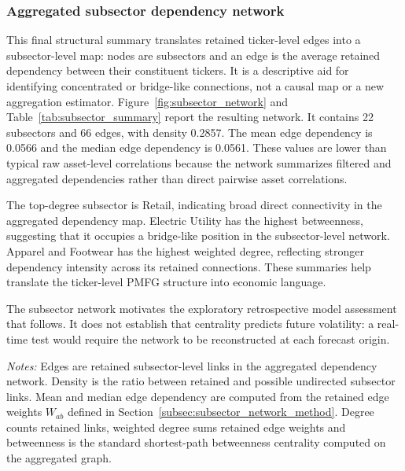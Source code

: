 \subsubsection{Aggregated subsector dependency network}
\label{sec:subsector_network}

This final structural summary translates retained ticker-level edges into a subsector-level map: nodes are subsectors and an edge is the average retained dependency between their constituent tickers. It is a descriptive aid for identifying concentrated or bridge-like connections, not a causal map or a new aggregation estimator. Figure~\ref{fig:subsector_network} and Table~\ref{tab:subsector_summary} report the resulting network. It contains 22 subsectors and 66 edges, with density 0.2857. The mean edge dependency is 0.0566 and the median edge dependency is 0.0561. These values are lower than typical raw asset-level correlations because the network summarizes filtered and aggregated dependencies rather than direct pairwise asset correlations.

The top-degree subsector is Retail, indicating broad direct connectivity in the aggregated dependency map. Electric Utility has the highest betweenness, suggesting that it occupies a bridge-like position in the subsector-level network. Apparel and Footwear has the highest weighted degree, reflecting stronger dependency intensity across its retained connections. These summaries help translate the ticker-level PMFG structure into economic language.

The subsector network motivates the exploratory retrospective model assessment that follows. It does not establish that centrality predicts future volatility: a real-time test would require the network to be reconstructed at each forecast origin.


\begin{center}
\label{tab:subsector_summary}
\end{center}
\noindent\footnotesize\emph{Notes:} Edges are retained subsector-level links in the aggregated dependency network. Density is the ratio between retained and possible undirected subsector links. Mean and median edge dependency are computed from the retained edge weights $W_{ab}$ defined in Section~\ref{subsec:subsector_network_method}. Degree counts retained links, weighted degree sums retained edge weights and betweenness is the standard shortest-path betweenness centrality computed on the aggregated graph.

